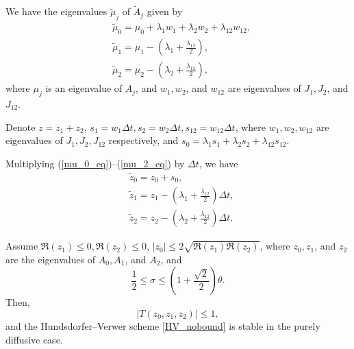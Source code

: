 {%




We have the eigenvalues $\tilde{\mu}_j$ of $\tilde{A}_j$ given by
\begin{align}
	& \tilde{\mu}_0 = \mu_0 + \lambda_1 w_1 + \lambda_2 w_2 + \lambda_{12} w_{12}, \label{mu_0_eq} \\
	& \tilde{\mu}_1 = \mu_1 - \left(\lambda_1 + \frac{\lambda_{12}}{2}\right), \label{mu_1_eq}\\
	& \tilde{\mu}_2 = \mu_2 - \left(\lambda_2 + \frac{\lambda_{12}}{2}\right) \label{mu_2_eq},
\end{align}
where $\mu_j$ is  an eigenvalue of $A_j$, and $w_1, w_2$, and $w_{12}$ are eigenvalues of $J_1, J_2$, and $J_{12}$.

Denote %
$z = z_1 + z_2$, $s_1 = w_1  \Delta t, s_2 = w_2 \Delta t, s_{12} = w_{12} \Delta t$, where $w_1, w_2, w_{12}$ are eigenvalues of $J_1, J_2, J_{12}$ respectively, and $s_0 = \lambda_1 s_1 + \lambda_2 s_2 + \lambda_{12} s_{12}$.

	Multiplying (\ref{mu_0_eq})--(\ref{mu_2_eq}) by $\Delta t$, we have 
	\begin{align} 
		& \tilde{z}_0 = z_0 + s_0, \label{tilde_z0} \\
		& \tilde{z}_1 = z_1 - \left(\lambda_1 + \frac{\lambda_{12}}{2}\right) \Delta t, \\
		& \tilde{z}_2 = z_2 - \left(\lambda_2 + \frac{\lambda_{12}}{2}\right) \Delta t.  \label{tilde_z2} 		
	\end{align}
\begin{theorem}
	\label{theor_inthout}
	Assume $\Re({z}_1) \le 0, \Re({z}_2) \le 0$, $|{z}_0| \le 2\sqrt{\Re({z}_1) \Re({z}_2)}$, where ${z}_0, {z}_1$, and ${z}_2$ are the eigenvalues of ${A}_0, {A}_1$, and ${A}_2$, %
	and
	\begin{equation*}
		\frac{1}{2} \le \sigma \le \left(1 + \frac{\sqrt{2}}{2} \right) \theta.
	\end{equation*}
	Then,
	\begin{equation*}
		|T({z}_0, {z}_1, {z}_2)| \le 1,
	\end{equation*}
	and the Hundsdorfer--Verwer scheme \eqref{HV_nobound} is stable in the purely diffusive case.
\end{theorem}

}
